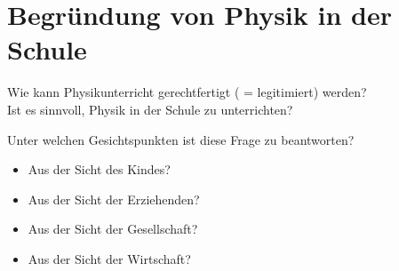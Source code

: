 \documentclass[11pt,a4paper]{book}
\begin{document}
\chapter{Begr\"{u}ndung von Physik in der Schule}\label{Begruendung}

Wie kann Physikunterricht gerechtfertigt ( = legitimiert) werden? \\
Ist es sinnvoll, Physik in der Schule zu unterrichten?

Unter welchen Gesichtspunkten ist diese Frage zu beantworten?
\begin{itemize}
	\item Aus der Sicht des Kindes?
	\item Aus der Sicht der Erziehenden?
	\item Aus der Sicht der Gesellschaft?
	\item Aus der Sicht der Wirtschaft?
\end{itemize}
\end{document}
